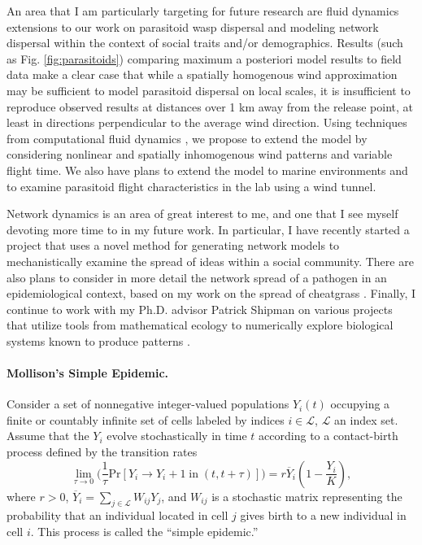 \documentclass[11pt]{article}
\begin{document}
An area that I am particularly targeting for future research are fluid dynamics extensions to our work on parasitoid wasp dispersal and modeling network dispersal within the context of social traits and/or demographics. Results (such as Fig. \ref{fig:parasitoids}) comparing maximum a posteriori model results to field data make a clear case that while a spatially homogenous wind approximation may be sufficient to model parasitoid dispersal on local scales, it is insufficient to reproduce observed results at distances over 1 km away from the release point, at least in directions perpendicular to the average wind direction. Using techniques from computational fluid dynamics \cite{Battista16}, we propose to extend the model by considering nonlinear and spatially inhomogenous wind patterns and variable flight time. We also have plans to extend the model to marine environments and to examine parasitoid flight characteristics in the lab using a wind tunnel.

Network dynamics is an area of great interest to me, and one that I see myself devoting more time to in my future work. In particular, I have recently started a project that uses a novel method for generating network models to mechanistically examine the spread of ideas within a social community. There are also plans to consider in more detail the network spread of a pathogen in an epidemiological context, based on my work on the spread of cheatgrass \cite{Strickland15}. Finally, I continue to work with my Ph.D. advisor Patrick Shipman on various projects that utilize tools from mathematical ecology to numerically explore biological systems known to produce patterns \cite{Shipman13,Pearson16}.

\small



\newpage
\appendix

\paragraph{Mollison's Simple Epidemic.} Consider a set of nonnegative integer-valued populations $Y_i(t)$ occupying a finite or countably infinite set of cells labeled by indices $i\in\mathcal{L}$, $\mathcal{L}$ an index set. Assume that the $Y_i$ evolve stochastically in time $t$ according to a contact-birth process \cite{Mollison77} defined by the transition rates
\begin{equation}
\lim_{\tau\rightarrow 0}\Big(\frac{1}{\tau}\mbox{Pr}[Y_i\rightarrow Y_i+1\;\mbox{in}\;(t,t+\tau)]\Big)=r\overline{Y}_i(1-\frac{Y_i}{K}),
\label{eqn:transition-rate}
\end{equation}
where $r>0$, $\overline{Y}_i=\sum_{j\in\mathcal{L}}W_{ij}Y_j$, and $W_{ij}$ is a stochastic matrix representing the probability that an individual located in cell $j$ gives birth to a new individual in cell $i$. This process is called the ``simple epidemic.''
\end{document}
